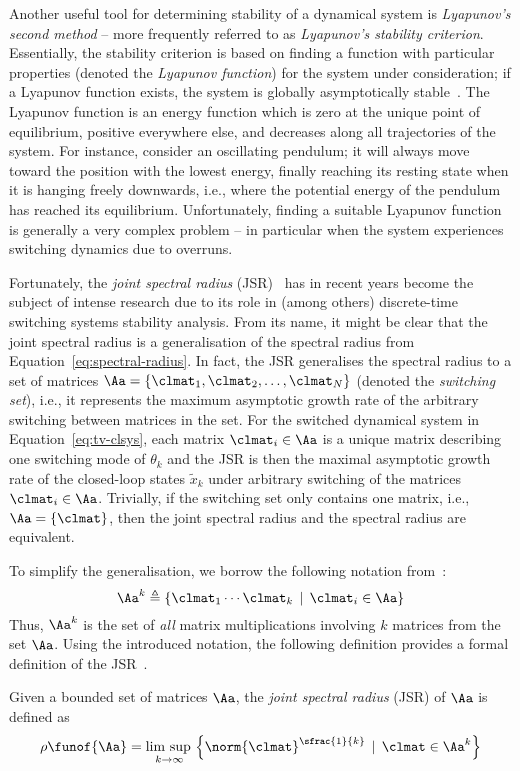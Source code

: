 Another useful tool for determining stability of a dynamical system is \emph{Lyapunov's second method} -- more frequently referred to as \emph{Lyapunov's stability criterion}.
Essentially, the stability criterion is based on finding a function with particular properties (denoted the \emph{Lyapunov function}) for the system under consideration; if a Lyapunov function exists, the system is globally asymptotically stable~\cite{Astrom:1997}.
The Lyapunov function is an energy function which is zero at the unique point of equilibrium, positive everywhere else, and decreases along all trajectories of the system.
For instance, consider an oscillating pendulum; it will always move toward the position with the lowest energy, finally reaching its resting state when it is hanging freely downwards, i.e., where the potential energy of the pendulum has reached its equilibrium.
Unfortunately, finding a suitable Lyapunov function is generally a very complex problem -- in particular when the system experiences switching dynamics due to overruns.

Fortunately, the \emph{joint spectral radius} (JSR)~\cite{Rota:1960} has in recent years become the subject of intense research due to its role in (among others) discrete-time switching systems stability analysis.
From its name, it might be clear that the joint spectral radius is a generalisation of the spectral radius from Equation~\eqref{eq:spectral-radius}.
In fact, the JSR generalises the spectral radius to a set of matrices $\Aa = \left\{ \clmat_1, \clmat_2, \ldots, \clmat_N \right\}$ (denoted the \emph{switching set}), i.e., it represents the maximum asymptotic growth rate of the arbitrary switching between matrices in the set.
For the switched dynamical system in Equation~\eqref{eq:tv-clsys}, each matrix $\clmat_i \in \Aa$ is a unique matrix describing one switching mode of $\theta_k$ and the JSR is then the maximal asymptotic growth rate of the closed-loop states $\tilde{x}_k$ under arbitrary switching of the matrices $\clmat_i \in \Aa$.
Trivially, if the switching set only contains one matrix, i.e., $\Aa = \left\{ \clmat \right\}$, then the joint spectral radius and the spectral radius are equivalent.

To simplify the generalisation, we borrow the following notation from~\cite{Jungers:2009}:
%
\begin{equation}
    \Aa^k \triangleq \left\{ \clmat_1 \cdots \clmat_k \,\mid\, \clmat_i \in \Aa \right\}
\end{equation}
%
Thus, $\Aa^k$ is the set of \emph{all} matrix multiplications involving $k$ matrices from the set $\Aa$.
Using the introduced notation, the following definition provides a formal definition of the JSR~\cite{Jungers:2009}.
%
\begin{definition}%
    \label{def:jsr}%
    Given a bounded set of matrices $\Aa$, the \emph{joint spectral radius} (JSR) of $\Aa$ is defined as
    \begin{equation*}
        \rho\funof{\Aa} = \underset{k\rightarrow\infty}{\lim{}\sup{}} \left\{ \norm{\clmat}^{\sfrac{1}{k}} \,\mid\, \clmat \in \Aa^k \right\}
    \end{equation*}
\end{definition}

